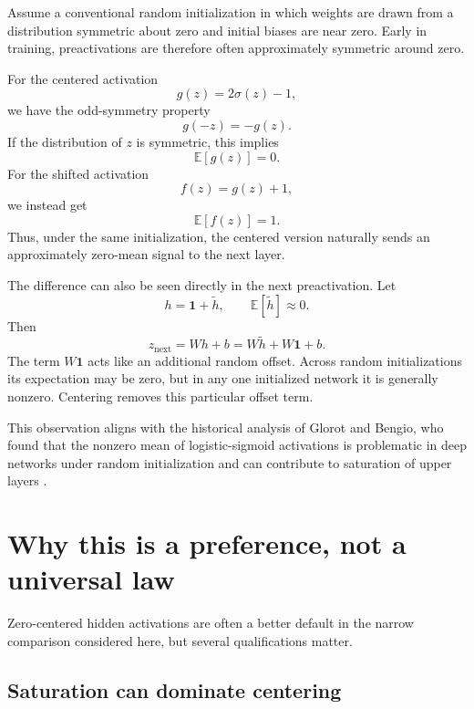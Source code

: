 \documentclass[11pt]{article}
\newcommand{\E}{\mathbb{E}}
\begin{document}
Assume a conventional random initialization in which weights are drawn from a distribution symmetric about zero and initial biases are near zero.  Early in training, preactivations are therefore often approximately symmetric around zero.

For the centered activation
\begin{equation}
  g(z)=2\sigma(z)-1,
\end{equation}
we have the odd-symmetry property
\begin{equation}
  g(-z)=-g(z).
\end{equation}
If the distribution of \(z\) is symmetric, this implies
\begin{equation}
  \E[g(z)]=0.
\end{equation}
For the shifted activation
\[
  f(z)=g(z)+1,
\]
we instead get
\begin{equation}
  \E[f(z)]=1.
\end{equation}
Thus, under the same initialization, the centered version naturally sends an approximately zero-mean signal to the next layer.

The difference can also be seen directly in the next preactivation.  Let
\[
  h=\mathbf{1}+\tilde h,
  \qquad \E[\tilde h]\approx0.
\]
Then
\begin{equation}
  z_{\text{next}}=W h+b
  =W\tilde h+W\mathbf{1}+b.
  \label{eq:randomoffset}
\end{equation}
The term \(W\mathbf{1}\) acts like an additional random offset.  Across random initializations its expectation may be zero, but in any one initialized network it is generally nonzero.  Centering removes this particular offset term.

This observation aligns with the historical analysis of Glorot and Bengio, who found that the nonzero mean of logistic-sigmoid activations is problematic in deep networks under random initialization and can contribute to saturation of upper layers \cite{glorot2010}.

\section{Why this is a preference, not a universal law}

Zero-centered hidden activations are often a better default in the narrow comparison considered here, but several qualifications matter.

\subsection{Saturation can dominate centering}
\end{document}
